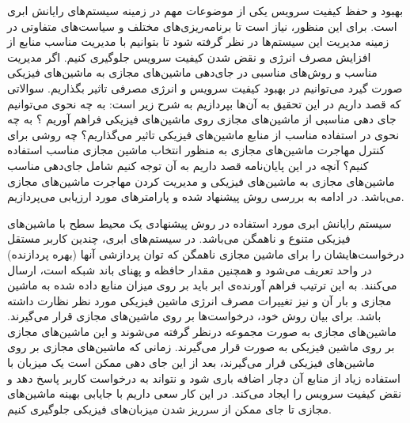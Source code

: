 \label{فصل‌پیشنهاد}
 بهبود و حفظ کیفیت سرویس یکی از موضوعات مهم در زمینه سیستم‌های رایانش ابری است. برای این منظور، نیاز است تا برنامه‌ریزی‌های مختلف و سیاست‌های متفاوتی در زمینه مدیریت این سیستم‌ها در نظر گرفته شود تا بتوانیم با مدیریت مناسب منابع از افزایش مصرف انرژی  و نقض شدن کیفیت سرویس جلوگیری کنیم. اگر مدیریت مناسب و روش‌های مناسبی در جای‌دهی ماشین‌های مجازی به ماشین‌های فیزیکی صورت گیرد می‌توانیم در بهبود کیفیت سرویس و انرژی مصرفی تاثیر بگذاریم. سوالاتی که قصد داریم  در این تحقیق به آن‌ها بپردازیم به شرح زیر است:
 به چه نحوی می‌توانیم جای دهی مناسبی از ماشین‌های مجازی روی ماشین‌های فیزیکی فراهم آوریم ؟
 به چه نحوی در استفاده مناسب از منابع ماشین‌های فیزیکی تاثیر می‌گذاریم؟
 چه روشی برای کنترل مهاجرت ماشین‌های مجازی به منظور انتخاب ماشین مجازی مناسب استفاده کنیم؟
آنچه در این پایان‌نامه قصد داریم به آن توجه کنیم شامل جای‌دهی مناسب ماشین‌های مجازی به ماشین‌های فیزیکی و مدیریت کردن مهاجرت ماشین‌های مجازی می‌باشد. 
در ادامه به بررسی روش پیشنهاد شده و پارامتر‌های مورد ارزیابی می‌پردازیم.

سیستم رایانش ابری مورد استفاده در روش پیشنهادی یک محیط سطح
 با ماشین‌های فیزیکی متنوع و ناهمگن می‌باشد. در سیستم‌های ابری، چندین کاربر مستقل درخواست‌هایشان را برای
  ماشین مجازی ناهمگن که توان پردازشی آنها (بهره پردازنده) در واحد
    تعریف می‌شود و همچنین مقدار حافظه و پهنای باند شبکه است، ارسال می‌کنند. به این ترتیب فراهم آورنده‌ی ابر باید بر روی میزان منابع داده شده به ماشین مجازی و بار آن و نیز تغییرات مصرف انرژی ماشین فیزیکی مورد نظر نظارت داشته باشد. 
برای بیان روش خود، درخواست‌ها بر روی ماشین‌های مجازی قرار می‌گیرند. ماشین‌های مجازی به صورت مجموعه
 درنظر گرفته می‌شوند و این ماشین‌های مجازی بر روی 
 ماشین فیزیکی به صورت 
  قرار می‌گیرند. زمانی که ماشین‌های مجازی بر روی ماشین‌های فیزیکی قرار می‌گیرند، بعد از این جای دهی ممکن است یک میزبان با استفاده زیاد از منابع آن دچار اضافه باری شود و نتواند به درخواست کاربر پاسخ دهد و نقض کیفیت سرویس را ایجاد می‌کند. در این کار سعی داریم با جایابی بهینه ماشین‌های مجازی تا جای ممکن از سرریز شدن میزبان‌های فیزیکی جلوگیری کنیم.
  
